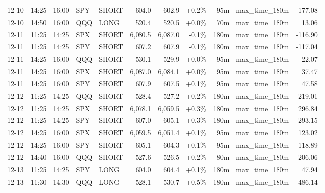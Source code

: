 \documentclass[11pt,a4paper,twoside]{article}
\begin{document}
\begin{center}
\begin{longtable}{>{\color{txtmain}}l l l l l r r r r >{\color{txtmain}}l r}
12-10 & 14:25 & 16:00 & SPY & SHORT & 604.0 & 602.9 & \textcolor{wingreen}{+0.2\%} & 95m & max\_time\_180m & \textcolor{wingreen}{177.08} \\
12-10 & 14:50 & 16:00 & QQQ & LONG & 520.4 & 520.5 & \textcolor{wingreen}{+0.0\%} & 70m & max\_time\_180m & \textcolor{wingreen}{13.06} \\
12-11 & 11:25 & 14:25 & SPX & SHORT & 6,080.5 & 6,087.0 & \textcolor{lossred}{-0.1\%} & 180m & max\_time\_180m & \textcolor{lossred}{-116.90} \\
12-11 & 11:25 & 14:25 & SPY & SHORT & 607.2 & 607.9 & \textcolor{lossred}{-0.1\%} & 180m & max\_time\_180m & \textcolor{lossred}{-117.04} \\
12-11 & 14:25 & 16:00 & QQQ & SHORT & 530.1 & 529.9 & \textcolor{wingreen}{+0.0\%} & 95m & max\_time\_180m & \textcolor{wingreen}{22.07} \\
12-11 & 14:25 & 16:00 & SPX & SHORT & 6,087.0 & 6,084.1 & \textcolor{wingreen}{+0.0\%} & 95m & max\_time\_180m & \textcolor{wingreen}{37.47} \\
12-11 & 14:25 & 16:00 & SPY & SHORT & 607.9 & 607.5 & \textcolor{wingreen}{+0.1\%} & 95m & max\_time\_180m & \textcolor{wingreen}{47.58} \\
12-12 & 11:25 & 14:25 & QQQ & SHORT & 528.4 & 527.2 & \textcolor{wingreen}{+0.2\%} & 180m & max\_time\_180m & \textcolor{wingreen}{219.01} \\
12-12 & 11:25 & 14:25 & SPX & SHORT & 6,078.1 & 6,059.5 & \textcolor{wingreen}{+0.3\%} & 180m & max\_time\_180m & \textcolor{wingreen}{296.84} \\
12-12 & 11:25 & 14:25 & SPY & SHORT & 607.0 & 605.1 & \textcolor{wingreen}{+0.3\%} & 180m & max\_time\_180m & \textcolor{wingreen}{293.15} \\
12-12 & 14:25 & 16:00 & SPX & SHORT & 6,059.5 & 6,051.4 & \textcolor{wingreen}{+0.1\%} & 95m & max\_time\_180m & \textcolor{wingreen}{123.02} \\
12-12 & 14:25 & 16:00 & SPY & SHORT & 605.1 & 604.3 & \textcolor{wingreen}{+0.1\%} & 95m & max\_time\_180m & \textcolor{wingreen}{118.89} \\
12-12 & 14:40 & 16:00 & QQQ & SHORT & 527.6 & 526.5 & \textcolor{wingreen}{+0.2\%} & 80m & max\_time\_180m & \textcolor{wingreen}{206.06} \\
12-13 & 11:25 & 14:25 & SPY & LONG & 604.0 & 604.4 & \textcolor{wingreen}{+0.1\%} & 180m & max\_time\_180m & \textcolor{wingreen}{47.94} \\
12-13 & 11:30 & 14:30 & QQQ & LONG & 528.1 & 530.7 & \textcolor{wingreen}{+0.5\%} & 180m & max\_time\_180m & \textcolor{wingreen}{486.14} \\

\end{longtable}
\end{center}
\end{document}
